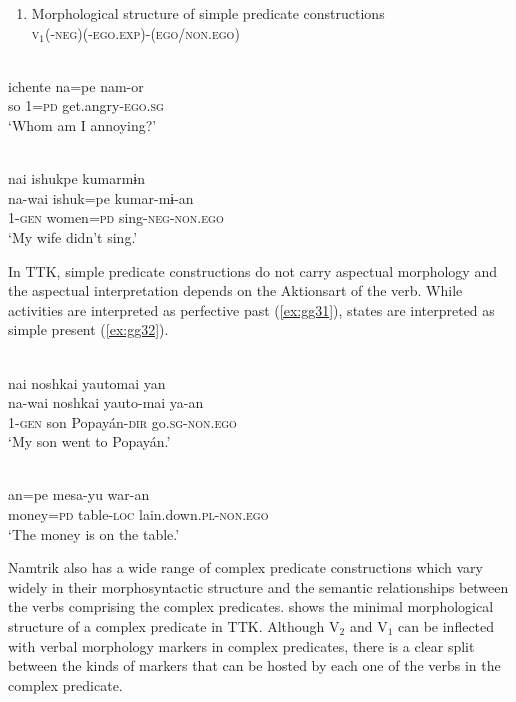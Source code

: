 \documentclass[output=paper]{langsci/langscibook}
\begin{document}
\begin{enumerate}[resume]
    \item Morphological structure of simple predicate constructions \label{fig:gg2}\\
\textsc{v}$_1$(-\textsc{neg})(-\textsc{ego.exp})-(\textsc{ego/non.ego})
\end{enumerate}



\ea \label{ex:gg29}
\\
    \gll ichente na=pe nam-or\\
         so 1=\textsc{pd} get.angry-\textsc{ego.sg}\\
    \glt ‘Whom am I annoying?'
\z

\ea \label{ex:gg30}
\\
    \glll nai	ishukpe	kumarmɨn\\
    na-wai	ishuk=pe kumar-mɨ-an\\
         1-\textsc{gen}	women=\textsc{pd}	sing-\textsc{neg-non.ego}\\
    \glt ‘My wife didn’t sing.’
\z

In TTK, simple predicate constructions do not carry aspectual morphology and the aspectual interpretation depends on the Aktionsart of the verb. While activities are interpreted as perfective past (\ref{ex:gg31}), states are interpreted as simple present (\ref{ex:gg32}).

\ea \label{ex:gg31}
\\
    \glll nai	noshkai	yautomai	yan\\
    na-wai	noshkai	yauto-mai ya-an\\
         1-\textsc{gen} son Popayán-\textsc{dir} go.\textsc{sg-non.ego}\\
    \glt ‘My son went to Popayán.'
\z

\ea \label{ex:gg32}
\\
    \gll an=pe	mesa-yu	war-an\\
         money=\textsc{pd}	table-\textsc{loc} lain.down.\textsc{pl-non.ego}\\
    \glt ‘The money is on the table.’
\z

Namtrik also has a wide range of complex predicate constructions which vary widely in their morphosyntactic structure and the semantic relationships between the verbs comprising the complex predicates.  shows the minimal morphological structure of a complex predicate in TTK. Although V$_2$ and V$_1$ can be inflected with verbal morphology markers in complex predicates, there is a clear split between the kinds of markers that can be hosted by each one of the verbs in the complex predicate.
\end{document}
